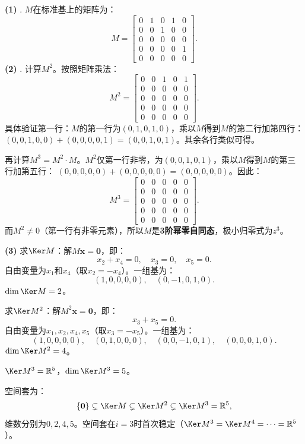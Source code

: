 \documentclass[12pt,UTF8]{ctexbook}
\begin{document}
\begin{so}
\textbf{(1)} .\;
$M$在标准基上的矩阵为：
$$
M = \begin{bmatrix}
0 & 1 & 0 & 1 & 0 \\
0 & 0 & 1 & 0 & 0 \\
0 & 0 & 0 & 0 & 0 \\
0 & 0 & 0 & 0 & 1 \\
0 & 0 & 0 & 0 & 0
\end{bmatrix}.
$$
\textbf{(2)} .\;
计算$M^2$。按照矩阵乘法：
$$
M^2 = \begin{bmatrix}
0 & 0 & 1 & 0 & 1 \\
0 & 0 & 0 & 0 & 0 \\
0 & 0 & 0 & 0 & 0 \\
0 & 0 & 0 & 0 & 0 \\
0 & 0 & 0 & 0 & 0
\end{bmatrix}.
$$
具体验证第一行：$M$的第一行为$(0,1,0,1,0)$，乘以$M$得到$M$的第二行加第四行：
$(0,0,1,0,0) + (0,0,0,0,1) = (0,0,1,0,1)$。其余各行类似可得。

再计算$M^3 = M^2 \cdot M$。$M^2$仅第一行非零，为$(0,0,1,0,1)$，乘以$M$得到$M$的第三行加第五行：
$(0,0,0,0,0) + (0,0,0,0,0) = (0,0,0,0,0)$。因此：
$$M^3 = \begin{bmatrix} 0 & 0 & 0 & 0 & 0 \\ 0 & 0 & 0 & 0 & 0 \\ 0 & 0 & 0 & 0 & 0 \\ 0 & 0 & 0 & 0 & 0 \\ 0 & 0 & 0 & 0 & 0 \end{bmatrix}.$$
而$M^2 \neq 0$（第一行有非零元素），所以$M$是\textbf{3阶幂零自同态}，极小归零式为$z^3$。

\textbf{(3)} 求$\Ker M$：解$M\mathbf{x} = \mathbf{0}$，即：
$$x_2 + x_4 = 0, \quad x_3 = 0, \quad x_5 = 0.$$
自由变量为$x_1$和$x_4$（取$x_2 = -x_4$）。一组基为：
$$(1,0,0,0,0), \quad (0,-1,0,1,0).$$
$\dim \Ker M = 2$。

求$\Ker M^2$：解$M^2\mathbf{x} = \mathbf{0}$，即：
$$x_3 + x_5 = 0.$$
自由变量为$x_1, x_2, x_4, x_5$（取$x_3 = -x_5$）。一组基为：
$$(1,0,0,0,0), \quad (0,1,0,0,0), \quad (0,0,-1,0,1), \quad (0,0,0,1,0).$$
$\dim \Ker M^2 = 4$。

$\Ker M^3 = \mathbb{R}^5$，$\dim \Ker M^3 = 5$。

空间套为：
$$\{\mathbf{0}\} \subsetneq \Ker M \subsetneq \Ker M^2 \subsetneq \Ker M^3 = \mathbb{R}^5,$$
维数分别为$0, 2, 4, 5$。空间套在$i=3$时首次稳定（$\Ker M^3 = \Ker M^4 = \cdots = \mathbb{R}^5$）。


\end{so}
\end{document}
